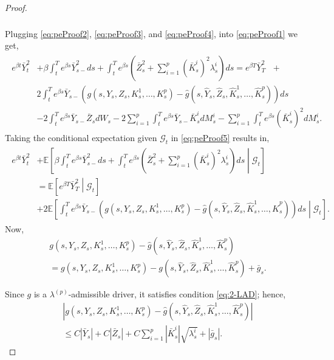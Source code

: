 \documentclass[10pt,a4paper]{amsart}
\begin{document}
\begin{proof}
\begin{align}
\begin{aligned}
        \end{aligned}
    \end{align}
    Plugging \eqref{eq:peProof2}, \eqref{eq:peProof3}, and \eqref{eq:peProof4}, into \eqref{eq:peProof1} we get,
    \begin{align}\label{eq:peProof5}
        \begin{aligned}
            e^{\beta t}\bar{Y}_t^2 &+ \beta\int_t^Te^{\beta s}\bar{Y}_{s-}^2ds + \int_t^Te^{\beta s}\left(\bar{Z}_s^2+\sum_{i=1}^p(\bar{K}_s^i)^2\lambda_s^i\right)ds = e^{\beta T}\bar{Y}_T^2\text{ }+\\ &2\int_t^Te^{\beta s}\bar{Y}_{s-}(g(s,Y_s,Z_s,K_s^1,\ldots,K_s^p) - \hat{g}(s,\hat{Y}_s,\hat{Z}_s,\hat{K}_s^1,\ldots,\hat{K}_s^p))ds\\
            &- 2\int_t^Te^{\beta s}\bar{Y}_{s-}\bar{Z}_sdW_s -2 \sum_{i=1}^p\int_t^Te^{\beta s}\bar{Y}_{s-}\bar{K}_s^idM_s^i-\sum_{i=1}^p\int_t^Te^{\beta s}(\bar{K}_s^i)^2dM_s^i.
        \end{aligned}
    \end{align}
    Taking the conditional expectation given $\mathcal{G}_t$ in \eqref{eq:peProof5} results in,
    \begin{align}\label{eq:interm99}
	\begin{aligned}
        e^{\beta t}\bar{Y}_t^2 &+ \mathbb{E}\left[\beta\int_t^Te^{\beta s}\bar{Y}_{s-}^2ds + \int_t^Te^{\beta s}\left(\bar{Z}_s^2+\sum_{i=1}^p(\bar{K}_s^i)^2\lambda_s^i\right)ds\middle|\mathcal{G}_t\right] \\&= \mathbb{E}\left[e^{\beta T}\bar{Y}_T^2\middle|\mathcal{G}_t\right] \\&+ 2\mathbb{E}\left[\int_t^Te^{\beta s}\bar{Y}_{s-}(g(s,Y_s,Z_s,K_s^1,\ldots,K_s^p) - \hat{g}(s,\hat{Y}_s,\hat{Z}_s,\hat{K}_s^1,\ldots,\hat{K}_s^p))ds\middle|\mathcal{G}_t\right].
	\end{aligned}
    \end{align}
    Now,
	\begin{multline*}
	g(s,Y_s,Z_s,K_s^1,\ldots,K_s^p) - \hat{g}(s,\hat{Y}_s,\hat{Z}_s,\hat{K}_s^1,\ldots,\hat{K}_s^p)\\= g(s,Y_s,Z_s,K_s^1,\ldots,K_s^p) - g(s,\hat{Y}_s,\hat{Z}_s,\hat{K}_s^1,\ldots,\hat{K}_s^p) + \bar{g}_s.
	\end{multline*}

Since $g$ is a $\lambda^{(p)}$-admissible driver, it satisfies condition \eqref{eq:2-LAD}; hence,
    \begin{multline*}
        |g(s,Y_s,Z_s,K_s^1,\ldots,K_s^p) - \hat{g}(s,\hat{Y}_s,\hat{Z}_s,\hat{K}_s^1,\ldots,\hat{K}_s^p)| \\\le C|\bar{Y}_s| + C|\bar{Z}_s| + C\sum_{i=1}^p|\bar{K}_s^i|\sqrt{\lambda_s^i} + |\bar{g}_s|.
    \end{multline*}


\end{proof}
\end{document}
